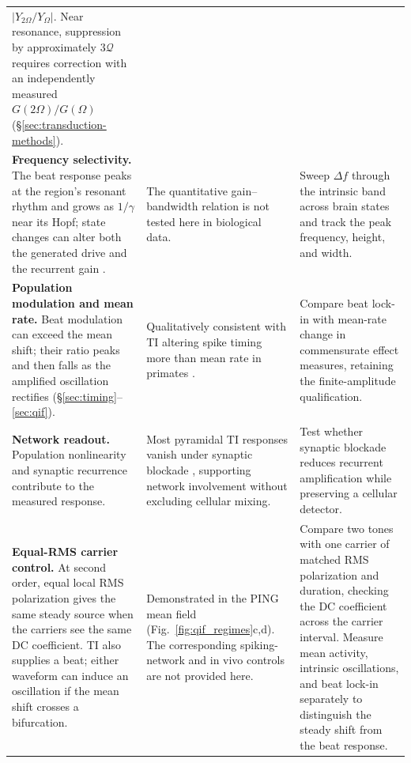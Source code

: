 \documentclass[11pt,a4paper]{article}
\newif\ifsupp
\begin{document}
\begin{longtable}{@{}>{\raggedright\arraybackslash}p{}
 >{\raggedright\arraybackslash}p{}
 >{\raggedright\arraybackslash}p{}@{}}
$|Y_{2\Omega}/Y_\Omega|$. Near resonance, suppression by approximately
$3\mathcal Q$ requires correction with an independently measured
$G(2\Omega)/G(\Omega)$ (\S\ref{sec:transduction-methods}). \\[4pt]
\textbf{Frequency selectivity.} The beat response peaks at the region's resonant
rhythm and grows as $1/\gamma$ near its Hopf; state changes can alter both the
generated drive and the recurrent gain \cite{ruffini2025cfc}.
& The quantitative gain--bandwidth relation is not tested here in biological data.
& Sweep $\Delta f$ through the intrinsic band across brain states and track the
peak frequency, height, and width. \\[4pt]
\textbf{Population modulation and mean rate.} Beat modulation can exceed the mean shift; their ratio
peaks and then falls as the amplified oscillation rectifies
(\S\ref{sec:timing}--\ref{sec:qif}).
& Qualitatively consistent with TI altering spike timing more than mean rate in
primates \cite{vieira2024}.
& Compare beat lock-in with mean-rate change in commensurate effect measures,
retaining the finite-amplitude qualification. \\[4pt]
\textbf{Network readout.} Population nonlinearity and synaptic recurrence contribute
to the measured response.
& Most pyramidal TI responses vanish under synaptic blockade \cite{caldas2024},
supporting network involvement without excluding cellular mixing.
& Test whether synaptic blockade reduces recurrent amplification while preserving
a cellular detector. \\[4pt]
\textbf{Equal-RMS carrier control.} At second order, equal local RMS
polarization gives the same steady source when the carriers see the same DC
coefficient. TI also supplies a beat; either waveform can induce an oscillation
if the mean shift crosses a bifurcation.
& Demonstrated in the PING mean field (Fig.~\ref{fig:qif_regimes}c,d).
The corresponding spiking-network and in vivo controls are not provided here.
& Compare two tones with one carrier of matched RMS polarization and duration,
checking the DC coefficient across the carrier interval. Measure mean activity,
intrinsic oscillations, and beat lock-in separately to distinguish the steady
shift from the beat response. \\
\end{longtable}
\endgroup


\ifsupp
\clearpage


\fi
\fi
\end{document}
